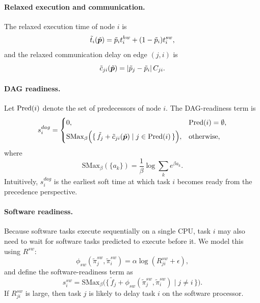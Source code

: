 \paragraph{\textbf{Relaxed execution and communication.}}
The relaxed execution time of node $i$ is
\begin{equation}
\tilde{t}_i(\tilde{{\bm{p}}})=\tilde{p}_i t_i^{hw} + (1-\tilde{p}_i)t_i^{sw},
\end{equation}
and the relaxed communication delay on edge $(j,i)$ is
\begin{equation}
\tilde{c}_{ji}(\tilde{{\bm{p}}})=|\tilde{p}_j-\tilde{p}_i|\,C_{ji}.
\end{equation}

\paragraph{\textbf{DAG readiness.}}
Let $\operatorname{Pred}(i)$ denote the set of predecessors of node $i$. The DAG-readiness term is
\begin{equation}
s_i^{dag}
=
\begin{cases}
0, & \operatorname{Pred}(i)=\emptyset,\\[4pt]
\mathrm{SMax}_{\beta}
\Big(
\{\, \tilde{f}_j + \tilde{c}_{ji}(\tilde{{\bm{p}}}) \mid j \in \operatorname{Pred}(i)\,\}
\Big), & \text{otherwise},
\end{cases}
\end{equation}
where
\begin{equation}
\mathrm{SMax}_{\beta}(\{a_k\})=\frac{1}{\beta}\log\sum_k e^{\beta a_k}.
\end{equation}
Intuitively, $s_i^{dag}$ is the earliest soft time at which task $i$ becomes ready from the precedence perspective.

\paragraph{\textbf{Software readiness.}}
Because software tasks execute sequentially on a single CPU, task $i$ may also need to wait for software tasks predicted to execute before it. We model this using $R^{sw}$:
\begin{equation}
\phi_{sw}(\tilde{\pi}_j^{sw},\tilde{\pi}_i^{sw})
=
\alpha \log(R^{sw}_{ji}+\epsilon),
\end{equation}
and define the software-readiness term as
\begin{equation}
s_i^{sw}
=
\mathrm{SMax}_{\beta}
\Big(
\{\, \tilde{f}_j + \phi_{sw}(\tilde{\pi}_j^{sw},\tilde{\pi}_i^{sw}) \mid j \neq i\,\}
\Big).
\end{equation}
If $R^{sw}_{ji}$ is large, then task $j$ is likely to delay task $i$ on the software processor.


